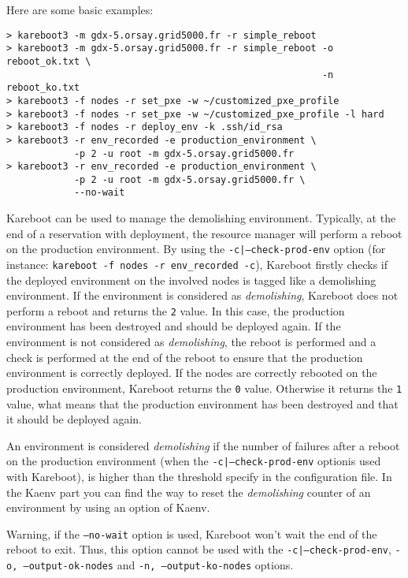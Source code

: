 \documentclass[a4wide,10pt,oneside]{book}
\begin{document}
Here are some basic examples:
\begin{verbatim}
> kareboot3 -m gdx-5.orsay.grid5000.fr -r simple_reboot
> kareboot3 -m gdx-5.orsay.grid5000.fr -r simple_reboot -o reboot_ok.txt \
                                                        -n reboot_ko.txt
> kareboot3 -f nodes -r set_pxe -w ~/customized_pxe_profile
> kareboot3 -f nodes -r set_pxe -w ~/customized_pxe_profile -l hard
> kareboot3 -f nodes -r deploy_env -k .ssh/id_rsa
> kareboot3 -r env_recorded -e production_environment \
            -p 2 -u root -m gdx-5.orsay.grid5000.fr
> kareboot3 -r env_recorded -e production_environment \
            -p 2 -u root -m gdx-5.orsay.grid5000.fr \
            --no-wait
\end{verbatim}

Kareboot can be used to manage the demolishing environment. Typically, at the end of a reservation with deployment, the resource manager will perform a reboot on the production environment. By using the \texttt{-c|--check-prod-env} option (for instance: \texttt{kareboot -f nodes -r env\_recorded -c}), Kareboot firstly checks if the deployed environment on the involved nodes is tagged like a demolishing environment. If the environment is considered as \textit{demolishing}, Kareboot does not perform a reboot and returns the \texttt{2} value. In this case, the production environment has been destroyed and should be deployed again. If the environment is not considered as \textit{demolishing}, the reboot is performed and a check is performed at the end of the reboot to ensure that the production environment is correctly deployed. If the nodes are correctly rebooted on the production environment, Kareboot returns the \texttt{0} value. Otherwise it returns the \texttt{1} value, what means that the production environment has been destroyed and that it should be deployed again.

An environment is considered \textit{demolishing} if the number of failures after a reboot on the production environment (when the \texttt{-c|--check-prod-env} optionis used with Kareboot), is higher than the threshold specify in the configuration file. In the Kaenv part you can find the way to reset the \textit{demolishing} counter of an environment by using an option of Kaenv.

Warning, if the \texttt{--no-wait} option is used, Kareboot won't wait the end of the reboot to exit. Thus, this option cannot be used with the \texttt{-c|--check-prod-env}, \texttt{-o, --output-ok-nodes} and \texttt{-n, --output-ko-nodes} options.
\end{document}
